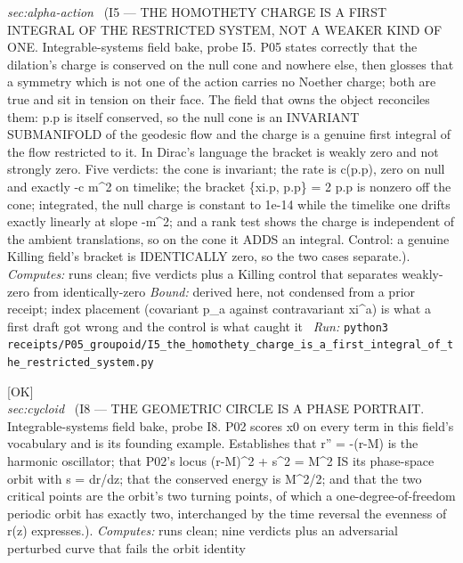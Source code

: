 \begin{description}
\textit{sec:alpha-action} \ (I5 --- THE HOMOTHETY CHARGE IS A FIRST INTEGRAL OF THE RESTRICTED SYSTEM, NOT A WEAKER KIND OF ONE. Integrable-systems field bake, probe I5. P05 states correctly that the dilation's charge is conserved on the null cone and nowhere else, then glosses that a symmetry which is not one of the action carries no Noether charge; both are true and sit in tension on their face. The field that owns the object reconciles them: p.p is itself conserved, so the null cone is an INVARIANT SUBMANIFOLD of the geodesic flow and the charge is a genuine first integral of the flow restricted to it. In Dirac's language the bracket is weakly zero and not strongly zero. Five verdicts: the cone is invariant; the rate is c(p.p), zero on null and exactly -c m\textasciicircum{}2 on timelike; the bracket \{xi.p, p.p\} = 2 p.p is nonzero off the cone; integrated, the null charge is constant to 1e-14 while the timelike one drifts exactly linearly at slope -m\textasciicircum{}2; and a rank test shows the charge is independent of the ambient translations, so on the cone it ADDS an integral. Control: a genuine Killing field's bracket is IDENTICALLY zero, so the two cases separate.). 
\emph{Computes:} runs clean; five verdicts plus a Killing control that separates weakly-zero from identically-zero
 \emph{Bound:} derived here, not condensed from a prior receipt; index placement (covariant p\_a against contravariant xi\textasciicircum{}a) is what a first draft got wrong and the control is what caught it
\ \emph{Run:} \texttt{python3 receipts/P05\_groupoid/I5\_the\_homothety\_charge\_is\_a\_first\_integral\_of\_the\_restricted\_system.py}
\item[\label{rcpt:I8_the_circle_is_a_phase_portrait_and_the_critical_points_are_turning_points}\texttt{I8\_the\_circle\_is\_a\_phase\_portrait\_and\_the\_critical\_points\_are\_turning\_points}]\hfill\textsf{[OK]}\\
\textit{sec:cycloid} \ (I8 --- THE GEOMETRIC CIRCLE IS A PHASE PORTRAIT. Integrable-systems field bake, probe I8. P02 scores x0 on every term in this field's vocabulary and is its founding example. Establishes that r'' = -(r-M) is the harmonic oscillator; that P02's locus (r-M)\textasciicircum{}2 + s\textasciicircum{}2 = M\textasciicircum{}2 IS its phase-space orbit with s = dr/dz; that the conserved energy is M\textasciicircum{}2/2; and that the two critical points are the orbit's two turning points, of which a one-degree-of-freedom periodic orbit has exactly two, interchanged by the time reversal the evenness of r(z) expresses.). 
\emph{Computes:} runs clean; nine verdicts plus an adversarial perturbed curve that fails the orbit identity

\end{description}
